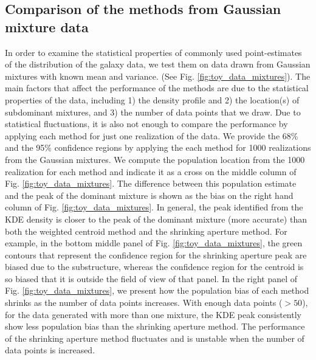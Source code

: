 \subsection{Comparison of the methods from Gaussian mixture data}
In order to examine the statistical properties of commonly used point-estimates 
of the distribution of the galaxy data, we test them on data drawn 
from Gaussian mixtures with known mean and variance. 
(See Fig.
\ref{fig:toy_data_mixtures}). 
The main factors that affect the performance of 
the methods are due to the statistical properties of the data, 
including 1) the density profile and 2) the
location(s) of subdominant mixtures, and 3) the number of data points that we draw.
Due to statistical fluctuations, it is also not enough to
compare the performance by applying each method for just one realization of the
data. We provide the 68\% and the 95\% confidence regions by applying the
each method for 1000 realizations from the Gaussian mixtures.
We compute the population location from the 1000 realization for each method 
and indicate it as a cross on the middle column of Fig. \ref{fig:toy_data_mixtures}.
The difference between this population estimate and the peak of the dominant mixture 
is shown as the bias on the right hand column of Fig.
\ref{fig:toy_data_mixtures}.
In general, the peak identified from the KDE density is closer to the 
peak of the dominant mixture (more accurate) than 
both the weighted centroid method and the shrinking aperture method.
For example, in the bottom middle panel of Fig. \ref{fig:toy_data_mixtures}, 
the green contours
that represent the confidence region for the shrinking aperture peak are
biased due to the substructure, whereas the confidence region for the centroid 
is so biased that it is outside the field of view of that panel.
In the right panel of Fig. \ref{fig:toy_data_mixtures}, 
we present how the population bias of each method shrinks as the
number of data points increases. With enough data points ($> 50$), 
for the data generated with more than one mixture, 
the KDE peak consistently show less population bias than the shrinking aperture method. 
The performance of the shrinking aperture method fluctuates and is unstable when
the number of data points is increased.

